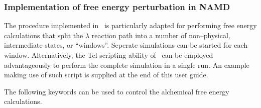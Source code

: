 \subsubsection{Implementation of free energy perturbation in NAMD}


The procedure implemented in \NAMD\ is particularly
adapted for performing free 
energy calculations that split the $\lambda$
reaction path into a number of non--physical,
intermediate states, or ``windows''. Seperate simulations 
can be started for each window.
Alternatively, the Tcl scripting ability of 
\NAMD\ can be employed advantageously
to perform the complete simulation in a single run.
An example making use of such script is supplied at the end 
of this user guide.


The following keywords can be used to control the alchemical free 
energy calculations. 

